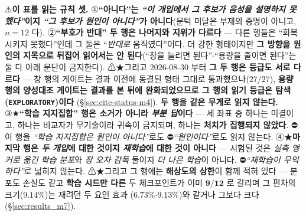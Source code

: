 \documentclass[11pt]{report}
\numberwithin{equation}{chapter}
\numberwithin{figure}{chapter}
\numberwithin{table}{chapter}
\begin{document}
\begin{center}
\end{center}

⚠\textbf{이 표를 읽는 규칙 셋.} ①\textbf{``아니다''는 \emph{``이 개입에서 그 후보가 음성을
설명하지 못했다''}이지 \emph{``그 후보가 원인이 아니다''}가 아니다}(문턱 미달은 부재의
증명이 아니고, $n = 12$ 다). ②\textbf{``부호가 반대'' 두 행은 나머지와 지위가 다르다} --- 다른
행들은 ``회복시키지 못했다''인데 그 둘은 ``\emph{반대로} 움직였다''이다. 더 강한 형태이지만
\textbf{그 방향을 원인의 지목으로 뒤집어 읽어서는 안 된다}(``창을 늘리면 된다''$\cdot$``용량을
줄이면 된다''는 둘 다 아래 문단이 금지한다).
⚠★그리고 2026-08-30 부터 \textbf{그 두 행은 등급도 서로 다르다} --- 창 행의 게이트는
결과 이전에 동결된 형태 그대로 통과했으나($27/27$), \textbf{용량 행의 양성대조 게이트는
결과를 본 뒤에 완화되었으므로 그 행의 읽기 등급은 탐색(\texttt{EXPLORATORY})이다}
(\S\ref{sec:cite-status-m4}). \textbf{두 행을 같은 무게로 읽지 않는다.}
③★\textbf{``학습 지지집합'' 행은 소거가 아니라 \emph{부분 답}이다} --- 세 좌표 중 하나는
미결이고, 하나는 비교자가 무기술이라 귀속이 금지되며, 하나는 \textbf{처치가 집행되지 않았다}.
⛔이 행을 \emph{``학습 지지집합은 원인이 아니다''}로도 ⛔\emph{``원인이다''}로도 읽지 않는다.
④★\textbf{마지막 행은 \emph{두 개입}에 대한 것이지 \emph{재학습}에 대한 것이 아니다} ---
시험된 것은 \emph{실측 앵커로 옮긴 학습 분포}와 \emph{장 오차 감독} 둘이지 \emph{더 나은
학습}이 아니다. ⛔\emph{``재학습이 무익하다''}로 넓히지 않는다. ⚠★그리고 그 행에는
\textbf{해상도의 상한}이 함께 적혀 있다 --- 분포도 손실도 같고 \textbf{학습 시드만 다른} 두
체크포인트가 이미 $\mathbf{9/12}$ 로 갈리며 그 편차의 크기($9.14\%$)는 재려던 두 요인 효과
($6.73\%$$\cdot$$9.13\%$)와 같거나 그보다 크다(\S\ref{sec:results_m7}).
\end{document}
